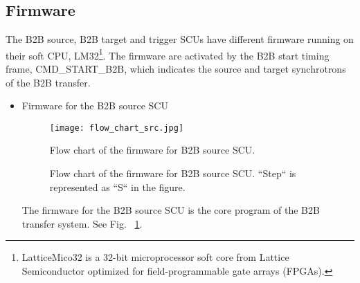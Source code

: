 \subsection{Firmware}

The B2B source, B2B target and trigger SCUs have different firmware running on their soft \gls{CPU}, LM32\footnote{LatticeMico32 is a 32-bit microprocessor soft core from Lattice Semiconductor optimized for field-programmable gate arrays (\gls{FPGA}s).}. The firmware are activated by the  B2B start timing frame, CMD\_START\_B2B, which indicates the source and target synchrotrons of the B2B transfer. 
\begin{itemize}
\item Firmware for the B2B source SCU
\begin{figure}[!htb]
   \centering   
   \texttt{[image: flow\_chart\_src.jpg]}
   \caption{Flow chart of the firmware for B2B source SCU.}
   \caption*{Flow chart of the firmware for B2B source SCU. ``Step`` is represented as ``S`` in the figure.}
   \label{flow_chart_src}
\end{figure}

The firmware for the B2B source SCU is the core program of the B2B transfer system. See Fig. ~\ref{flow_chart_src}. 


\end{itemize}
